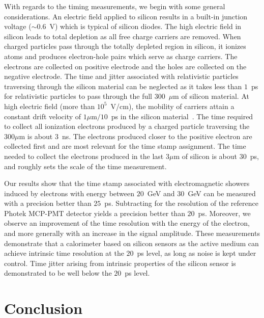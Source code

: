 \documentclass[12pt]{article}
\begin{document}
{With regards to the timing measurements, we begin with some general considerations.
An electric field applied to silicon results in a built-in junction voltage
($\sim 0.6$~V) which is typical of silicon diodes. The high electric field in silicon
leads to total depletion as all free charge carriers are removed. 
When charged particles pass through the totally depleted region in silicon, 
it ionizes atoms and produces electron-hole pairs which serve as charge carriers.
The electrons are collected on positive electrode and the holes are collected
on the negative electrode. The time and jitter associated with relativistic particles 
traversing through the silicon material can be neglected as it takes 
less than $1$~ps for relativistic particles to pass through the full $300$~$\mu$m
of silicon material. At high electric field (more than $10^{5}$~V/cm), the mobility 
of carriers attain a constant drift velocity of $1\mu$m$/10$~ps in the silicon 
material~\cite{Ronzhin2015,spieler2005semiconductor}. The time required to collect all ionization electrons
produced by a charged particle traversing the $300\mu$m is about $3$~ns.
The electrons produced closer to the positive electron are collected first and are
most relevant for the time stamp assignment. The time needed to collect the electrons
produced in the last $3\mu$m of silicon is about $30$~ps, and roughly sets the scale
of the time measurement.

Our results show that the time stamp associated with electromagnetic 
showers induced by electrons with energy between $20$~GeV and $30$~GeV 
can be measured with a precision better than $25$~ps. Subtracting for the resolution
of the reference Photek MCP-PMT detector yields a precision better than $20$~ps. 
Moreover, we observe an improvement of the time resolution with the energy of 
the electron, and more generally with an increase in the signal amplitude. 
These measurements demonstrate that a calorimeter based on silicon sensors as
the active medium can achieve intrinsic time resolution at the $20$~ps level, as long
as noise is kept under control. Time jitter arising from intrinsic properties of the
silicon sensor is demonstrated to be well below the $20$~ps level.

\section{Conclusion}
\label{sec:conclusion} 

}
\end{document}
